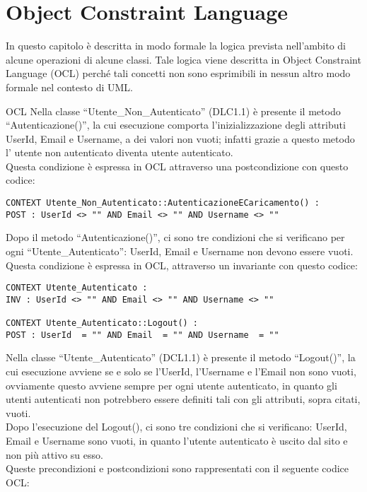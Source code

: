 \section{Object Constraint Language}
\label{secD3:ObjectConstraintLanguage}

In questo capitolo è descritta in modo formale la logica prevista nell'ambito di alcune operazioni di alcune classi. Tale logica viene descritta in Object Constraint Language (OCL) perché tali concetti non sono esprimibili in nessun altro modo formale nel contesto di UML.


\begin{listaPersonale}{OCL}
    Nella classe “Utente\_Non\_Autenticato” (DLC1.1) è presente il metodo “Autenticazione()”, la cui esecuzione comporta l'inizializzazione degli attributi UserId, Email e Username, a dei valori non vuoti; infatti grazie a questo metodo l' utente non autenticato diventa utente autenticato. \\
    Questa condizione è espressa in OCL attraverso una postcondizione con questo codice:
    \begin{lstlisting}
CONTEXT Utente_Non_Autenticato::AutenticazioneECaricamento() : 
POST : UserId <> "" AND Email <> "" AND Username <> ""
    \end{lstlisting}
    Dopo il metodo “Autenticazione()”, ci sono tre condizioni che si verificano per ogni “Utente\_Autenticato”: UserId, Email e Username non devono essere vuoti. \\ Questa condizione è espressa in OCL, attraverso un invariante con questo codice:
    \begin{lstlisting}
CONTEXT Utente_Autenticato : 
INV : UserId <> "" AND Email <> "" AND Username <> ""

CONTEXT Utente_Autenticato::Logout() : 
POST : UserId  = "" AND Email  = "" AND Username  = ""
    \end{lstlisting}
    Nella classe “Utente\_Autenticato” (DCL1.1) è presente il metodo “Logout()”, la cui esecuzione avviene se e solo se l'UserId, l'Username e l'Email non sono vuoti, ovviamente questo avviene sempre per ogni utente autenticato, in quanto gli utenti autenticati non potrebbero essere definiti tali con gli attributi, sopra citati, vuoti. \\
    Dopo l'esecuzione del Logout(), ci sono tre condizioni che si verificano: UserId, Email e Username sono vuoti, in quanto l'utente autenticato è uscito dal sito e non più attivo su esso. \\
    Queste precondizioni e postcondizioni sono rappresentati con il seguente codice OCL:




\end{listaPersonale}
